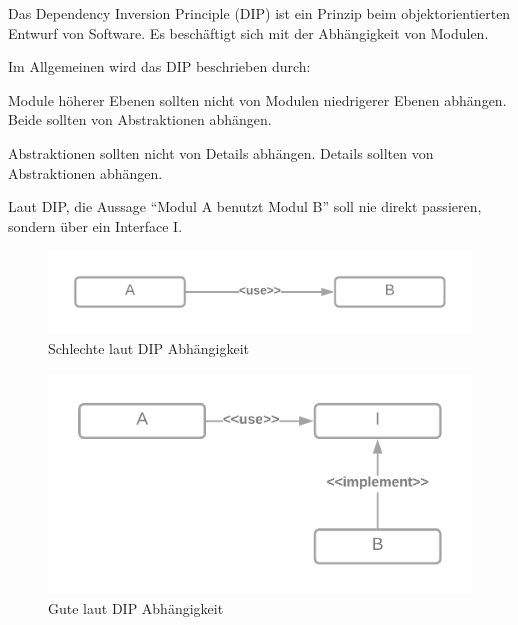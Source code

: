 Das Dependency Inversion Principle (DIP) ist ein Prinzip 
beim objektorientierten Entwurf von Software. Es beschäftigt sich mit der Abhängigkeit von Modulen.

Im Allgemeinen wird das DIP beschrieben durch:

Module höherer Ebenen sollten nicht von Modulen niedrigerer Ebenen abhängen.
Beide sollten von Abstraktionen abhängen.


Abstraktionen sollten nicht von Details abhängen.
Details sollten von Abstraktionen abhängen.

Laut DIP, die Aussage ``Modul A benutzt Modul B'' soll nie direkt passieren, sondern über ein Interface I.

\begin{figure}[H]
    \centering
    \includegraphics[width=1\textwidth]{./images/DIP - bad.png}
    \caption[Schlechte laut DIP Abhängigkeit]{Schlechte laut DIP Abhängigkeit \footnotemark}
    \label{fig:MVP}
\end{figure}


\begin{figure}[H]
    \centering
    \includegraphics[width=1\textwidth]{./images/DIP - good.png}
    \caption[Gute laut DIP Abhängigkeit]{Gute laut DIP Abhängigkeit \footnotemark}
    \label{fig:MVP}
\end{figure}


